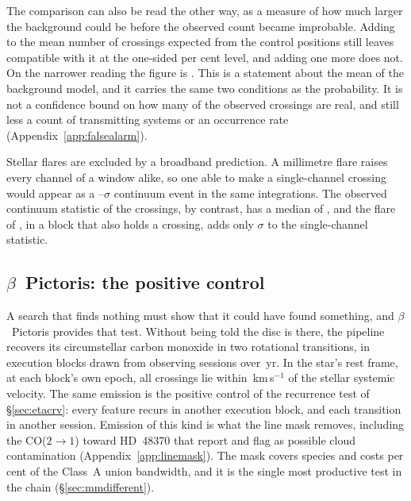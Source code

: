 The comparison can also be read the other way, as a measure of how much
larger the background could be before the observed count became improbable.
Adding \CeAddLim{} to the mean number of crossings expected from the control
positions still leaves \CeObs{} compatible with it at the one-sided
\CeAlphaPct{} per cent level, and adding one more does not. On the narrower
reading the figure is \FrNarrowAddLim. This is a statement about the mean of
the background model, and it carries the same two conditions as the
probability. It is not a confidence bound on how many of the observed
crossings are real, and still less a count of transmitting systems or an
occurrence rate (Appendix~\ref{app:falsealarm}).

Stellar flares are excluded by a broadband prediction. A millimetre flare
raises every channel of a window alike, so one able to make a single-channel
crossing would appear as a \FlPredLo--\FlPredHi$\sigma$ continuum event in
the same integrations. The observed continuum statistic of the crossings, by
contrast, has a median of \FlObsMed, and the \FlEgStar{} flare of
\citet{MacGregor2020}, in a block that also holds a crossing, adds only
\FlEgContrib$\sigma$ to the single-channel statistic.

\subsection{$\beta$~Pictoris: the positive control}
\label{sec:bpicval}

A search that finds nothing must show that it could have found something,
and $\beta$~Pictoris provides that test. Without being told the disc is
there, the pipeline recovers its circumstellar carbon monoxide
\citep{Dent2014,Matra2017} in two rotational transitions, in
\CsBpCoBlocks{} execution blocks drawn from \CsBpCoSess{} observing sessions
over \BpBaselineYr\,yr. In the star's rest frame, at each block's own epoch,
all \BpicPanelNCo{} crossings lie within \BpicDvCoHi\,km\,s$^{-1}$ of the
stellar systemic velocity. The same emission is the positive control of the
recurrence test of \S\ref{sec:etacrv}: every feature recurs in another
execution block, and each transition in another session. Emission of this
kind is what the line mask removes, including the CO($2{\to}1$) toward
HD~48370 that \citet{Cataldi2023} report and flag as possible cloud
contamination (Appendix~\ref{app:linemask}). The mask covers \FrNSpec{}
species and costs \MkMaskAPct{} per cent of the Class~A union bandwidth, and
it is the single most productive test in the chain
(\S\ref{sec:mmdifferent}).

